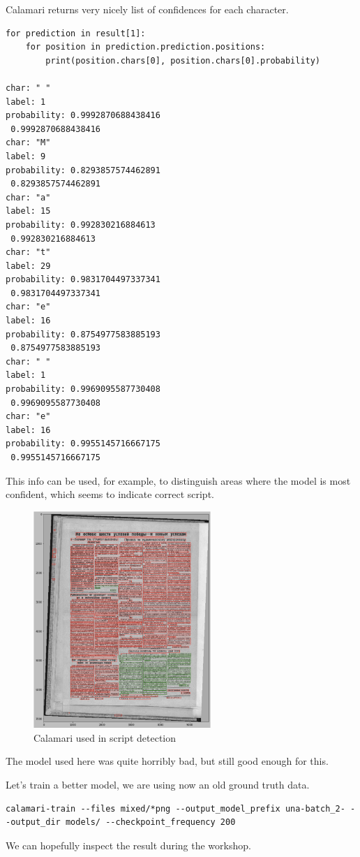 \documentclass[]{book}
\begin{document}
Calamari returns very nicely list of confidences for each character.

\begin{verbatim}
for prediction in result[1]:
    for position in prediction.prediction.positions:
        print(position.chars[0], position.chars[0].probability)
        
char: " "
label: 1
probability: 0.9992870688438416
 0.9992870688438416
char: "M"
label: 9
probability: 0.8293857574462891
 0.8293857574462891
char: "a"
label: 15
probability: 0.992830216884613
 0.992830216884613
char: "t"
label: 29
probability: 0.9831704497337341
 0.9831704497337341
char: "e"
label: 16
probability: 0.8754977583885193
 0.8754977583885193
char: " "
label: 1
probability: 0.9969095587730408
 0.9969095587730408
char: "e"
label: 16
probability: 0.9955145716667175
 0.9955145716667175
\end{verbatim}

This info can be used, for example, to distinguish areas where the model is most confident, which seems to indicate correct script.

\begin{figure}
\centering
\includegraphics[width=0.6\textwidth,height=\textheight]{images/calamari_script_detector.jpg}
\caption{Calamari used in script detection}
\end{figure}

The model used here was quite horribly bad, but still good enough for this.

Let's train a better model, we are using now an old ground truth data.

\begin{verbatim}
calamari-train --files mixed/*png --output_model_prefix una-batch_2- --output_dir models/ --checkpoint_frequency 200 
\end{verbatim}

We can hopefully inspect the result during the workshop.


\end{document}
